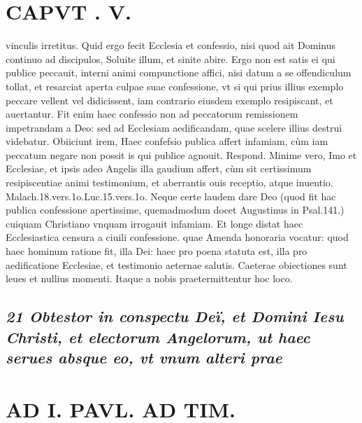 \documentclass{article}
\begin{document}
\begin{pages}
\section*{CAPVT . V. }
\marginpar{[ p.227 ]}\pstart vinculis irretitus. Quid ergo fecit Ecclesia et confessio, nisi quod ait Dominus continuo ad discipulos, Soluite illum, et sinite abire. Ergo non est satis ei qui publice peccauit, interni animi compunctione affici, nisi datum a se offendiculum tollat, et resarciat aperta culpae suae confessione, vt si qui prius illius exemplo peccare vellent vel didicissent, iam contrario eiusdem exemplo resipiscant, et auertantur. Fit enim haec confessio non ad peccatorum remissionem impetrandam a Deo: sed ad Ecclesiam aedificandam, quae scelere illius destrui videbatur.  \pend\pstart Obiiciunt irem, Haec confefsio publica affert infamiam, cùm iam peccatum negare non possit is qui publice agnouit. Respond. Minime vero, Imo et Ecclesiae, et ipsis adeo Angelis illa gaudium affert, cùm sit certissimum resipiscentiae animi testimonium, et aberrantis ouis receptio, atque inuentio. Malach.18.vers.1o.Luc.15.vers.1o. Neque  certe laudem dare Deo (quod fit hac publica confessione apertissime, quemadmodum docet Augustinus in Psal.141.) cuiquam Christiano vnquam irrogauit infamiam. Et longe distat haec Ecclesiastica censura a ciuili confessione. quae Amenda honoraria vocatur: quod haec hominum ratione fit, illa Dei: haec pro poena statuta est, illa pro aedificatione Ecclesiae, et testimonio aeternae salutis.  \pend\pstart Caeterae obiectiones sunt leues et nullius momenti. Itaque a nobis praetermittentur hoc loco.  \pend
{}
{}
\subsection*{\textit{21 Obtestor in conspectu Deï, et Domini Iesu Christi, et electorum Angelorum, ut haec serues absque eo, vt vnum alteri prae}}
\section*{AD I. PAVL. AD TIM. }
\marginpar{[ p.828 ]}
{}

\end{pages}
\end{document}
